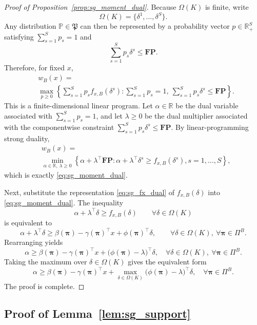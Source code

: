 \begin{proof}[Proof of Proposition~\ref{prop:sg_moment_dual}]
Because $\Omega(K)$ is finite, write
\[
\Omega(K)=\{\delta^1,\ldots,\delta^S\}.
\]
Any distribution $\mathbb P\in\mathfrak P$ can then be represented by a probability vector
$p\in\mathbb R_+^S$ satisfying $\sum_{s=1}^S p_s=1$ and
\[
\sum_{s=1}^S p_s\delta^s\le \mathbf{FP}.
\]
Therefore, for fixed $x$,
\[
\begin{aligned}
    &w_B(x)=\\
    &\max_{p\ge 0}
    \left\{
    \sum_{s=1}^S p_s f_{x,B}(\delta^s):
    \sum_{s=1}^S p_s=1,\
    \sum_{s=1}^S p_s\delta^s\le \mathbf{FP}
    \right\}.
\end{aligned}
\]
This is a finite-dimensional linear program. Let $\alpha\in\mathbb R$ be the dual variable associated with
$\sum_{s=1}^S p_s=1$, and let $\lambda\ge 0$ be the dual multiplier associated with the componentwise constraint
$\sum_{s=1}^S p_s\delta^s\le \mathbf{FP}$. By linear-programming strong duality,
\[
\begin{aligned}
    &w_B(x)=\\
    &\min_{\alpha\in\mathbb R,\ \lambda\ge 0}
    \left\{
    \alpha+\lambda^\top \mathbf{FP}:
    \alpha+\lambda^\top\delta^s\ge f_{x,B}(\delta^s), s=1,\ldots,S
    \right\},
\end{aligned}
\]
which is exactly \eqref{eq:sg_moment_dual}.

Next, substitute the representation \eqref{eq:sg_fx_dual} of $f_{x,B}(\delta)$ into
\eqref{eq:sg_moment_dual}. The inequality
\[
\alpha+\lambda^\top\delta\ge f_{x,B}(\delta)
\qquad \forall\delta\in\Omega(K)
\]
is equivalent to
\[
\alpha+\lambda^\top\delta\ge
\beta(\boldsymbol\pi)-\gamma(\boldsymbol\pi)^\top x+\phi(\boldsymbol\pi)^\top\delta,
\qquad \forall \delta\in\Omega(K),\ \forall\boldsymbol\pi\in\Pi^B.
\]
Rearranging yields
\[
\alpha\ge
\beta(\boldsymbol\pi)-\gamma(\boldsymbol\pi)^\top x+
\big(\phi(\boldsymbol\pi)-\lambda\big)^\top\delta,
\quad \forall \delta\in\Omega(K),\ \forall\boldsymbol\pi\in\Pi^B.
\]
Taking the maximum over $\delta\in\Omega(K)$ gives the equivalent form
\[
\alpha
\ge
\beta(\boldsymbol\pi)-\gamma(\boldsymbol\pi)^\top x
+\max_{\delta\in\Omega(K)}\big(\phi(\boldsymbol\pi)-\lambda\big)^\top\delta,
\quad \forall\boldsymbol\pi\in\Pi^B.
\]
The proof is complete.
\end{proof}

\subsection{Proof of Lemma~\ref{lem:sg_support}}

